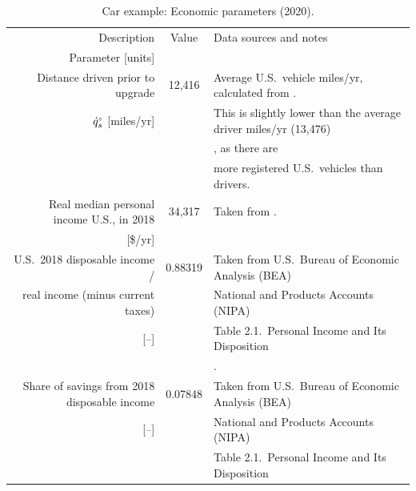 \documentclass[12pt]{article}\usepackage[]{graphicx}\usepackage[]{xcolor}
\begin{document}
\begin{landscape}
\begin{table}
\footnotesize
\begin{center}
\caption{Car example: Economic parameters (2020).}
\label{tab:car_economic_parameters}
\begin{tabular}{ r c l }
  \toprule
  Description & Value & Data sources and notes \\ 
  Parameter [units] & & \\
  \midrule
  Distance driven prior to upgrade   & 12,416        & Average U.S.\ vehicle miles/yr, calculated from \citet{Car_Insurance:2019}.  \\
  ${}{\dot{q}}^{\scriptscriptstyle \circ}_s$ [miles/yr]                                 &               & This is slightly lower than the average driver miles/yr (13,476) \\
                                                            &               & \citep{US_DoT:2018}, as there are \\
                                                            &               & more registered U.S.\ vehicles than drivers. \\
  \midrule
  Real median personal income U.S., in 2018                 & 34,317        & Taken from \citet{St_Louis_Fed:2019}.\\
  {} [\$/yr]                                                &               & \\
  \midrule
  U.S.\ 2018 disposable income /                            & 0.88319       & Taken from U.S.\ Bureau of Economic Analysis (BEA) \\
  real income (minus current taxes)                         &               & National and Products Accounts (NIPA) \\
  {} [--]                                                   &               & Table 2.1.\ Personal Income and Its Disposition \\
                                                            &               & \citep{US_BEA:2020}. \\ 
  \midrule
  Share of savings from 2018 disposable income              & 0.07848       & Taken from U.S.\ Bureau of Economic Analysis (BEA) \\
  {} [--]                                                   &               & National and Products Accounts (NIPA) \\ 
                                                            &               & Table 2.1.\ Personal Income and Its Disposition \\

\end{tabular}
\end{center}
\end{table}
\end{landscape}
\end{document}
